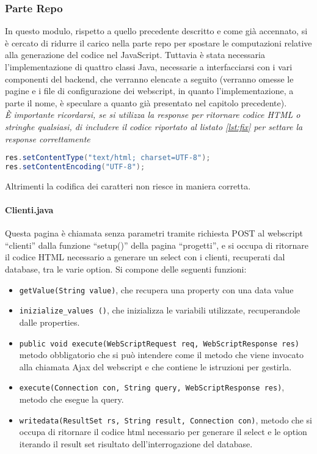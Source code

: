 \subsubsection{Parte Repo}
In questo modulo, rispetto a quello precedente descritto e come già accennato, si è cercato di ridurre il carico nella parte repo per spostare le computazioni relative alla generazione del codice nel JavaScript.
Tuttavia è stata necessaria l’implementazione di quattro classi Java, necessarie a interfacciarsi con i vari componenti del backend, che verranno elencate a seguito (verranno omesse le pagine e i file di configurazione dei webscript, in quanto l'implementazione, a parte il nome, è speculare a quanto già presentato nel capitolo precedente).\\
\emph{È importante ricordarsi, se si utilizza la response per ritornare codice HTML o stringhe qualsiasi, di includere il codice riportato al listato \ref{lst:fix} per settare la response correttamente}
\begin{lstlisting}[language=Java, caption=set dell'encoding,label=lst:fix]
res.setContentType("text/html; charset=UTF-8");
res.setContentEncoding("UTF-8");
\end{lstlisting}
Altrimenti la codifica dei caratteri non riesce in maniera corretta.
\paragraph{Clienti.java}
Questa pagina è chiamata senza parametri tramite richiesta POST al webscript “clienti” dalla funzione “setup()” della pagina “progetti”, e si occupa di ritornare il codice HTML necessario a generare un select con i clienti, recuperati dal database, tra le varie option.
Si compone delle seguenti funzioni:
\begin{itemize}
\item \texttt{getValue(String value)}, che recupera una property con una data value
\item \texttt{inizialize\_values ()}, che inizializza le variabili utilizzate, recuperandole dalle properties.
\item \texttt{public void execute(WebScriptRequest req, WebScriptResponse res)} metodo obbligatorio che si può intendere come il metodo che viene invocato alla chiamata Ajax del webscript e che contiene le istruzioni per gestirla.
\item \texttt{execute(Connection con, String query, WebScriptResponse res)}, metodo che esegue la query.
\item \texttt{writedata(ResultSet rs, String result, Connection con)}, metodo che si occupa di ritornare il codice html necessario per generare il select e le option iterando il result set risultato dell’interrogazione del database.
\end{itemize}
